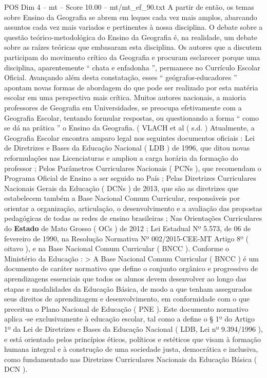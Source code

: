 \begin{textsample}{POS Dim 4 – mt – Score 10.00 – mt/mt\_ef\_90.txt}
A partir de então, os temas sobre Ensino da Geografia se abrem em leques cada vez mais amplos, abarcando assuntos cada vez mais variados e pertinentes à nossa disciplina.
O debate sobre a questão teórico-metodológica do Ensino da Geografia é, na realidade, um debate sobre as raízes teóricas que embasaram esta disciplina.
Os autores que a discutem participam do movimento crítico da Geografia e procuram esclarecer porque uma disciplina, aparentemente “ chata e enfadonha ”, permanece no Currículo Escolar Oficial.
Avançando além desta constatação, esses “ geógrafos-educadores ” apontam novas formas de abordagem do que pode ser realizado por esta matéria escolar em uma perspectiva mais crítica.
Muitos autores nacionais, a maioria professores de Geografia em Universidades, se preocupa efetivamente com a Geografia Escolar, tentando formular respostas, ou questionando a forma “ como se dá na prática ” o Ensino da Geografia. ( VLACH et al ( s.d. ) Atualmente, a Geografia Escolar encontra amparo legal nos seguintes documentos oficiais : Lei de Diretrizes e Bases da Educação Nacional ( LDB ) de 1996, que ditou novas reformulações nas Licenciaturas e ampliou a carga horária da formação do professor ; Pelos Parâmetros Curriculares Nacionais ( PCNs ), que recomendam o Programa Oficial de Ensino a ser seguido no País ; Pelas Diretrizes Curriculares Nacionais Gerais da Educação ( DCNs ) de 2013, que são as diretrizes que estabelecem também a Base Nacional Comum Curricular, responsáveis por orientar a organização, articulação, o desenvolvimento e a avaliação das propostas pedagógicas de todas as redes de ensino brasileiras ; Nas Orientações Curriculares do \textbf{Estado} de Mato Grosso ( OCs ) de 2012 ; Lei Estadual Nº 5.573, de 06 de fevereiro de 1990, na Resolução Normativa Nº 002/2015-CEE-MT Artigo 8º ( oitavo ), e na Base Nacional Comum Curricular ( BNCC ).
Conforme o Ministério da Educação : > A Base Nacional Comum Curricular ( BNCC ) é um documento de caráter normativo que define o conjunto orgânico e progressivo de aprendizagens essenciais que todos os alunos devem desenvolver ao longo das etapas e modalidades da Educação Básica, de modo a que tenham assegurados seus direitos de aprendizagem e desenvolvimento, em conformidade com o que preceitua o Plano Nacional de Educação ( PNE ).
Este documento normativo aplica -se exclusivamente à educação escolar, tal como a define o § 1º do Artigo 1º da Lei de Diretrizes e Bases da Educação Nacional ( LDB, Lei nº 9.394/1996 ), e está orientado pelos princípios éticos, políticos e estéticos que visam à formação humana integral e à construção de uma sociedade justa, democrática e inclusiva, como fundamentado nas Diretrizes Curriculares Nacionais da Educação Básica ( DCN ).

\end{textsample}

